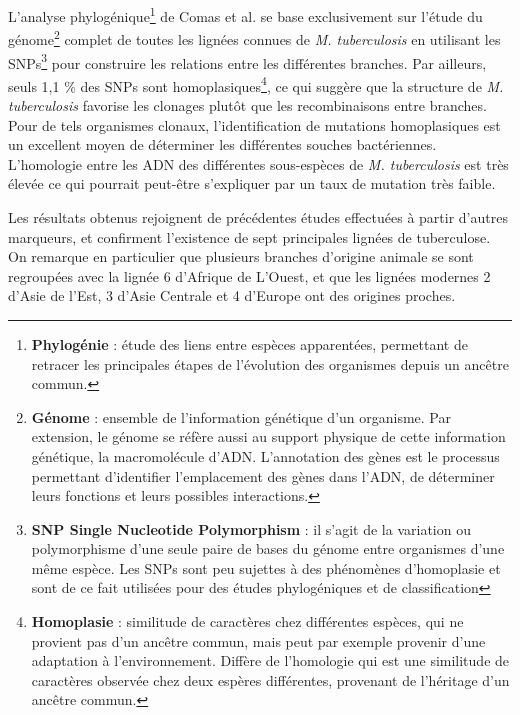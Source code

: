 \documentclass[twoside,a4paper,11pt,frenchb,openany]{report}
\begin{document}

L'analyse phylogénique\footnote{\textbf{Phylogénie} : étude des liens entre espèces apparentées, permettant de retracer les principales étapes de l'évolution des organismes depuis un ancêtre commun.} de Comas et al.\cite{comas} se base exclusivement sur l'étude du génome\footnote{\textbf{Génome} : ensemble de l'information génétique d'un organisme. Par extension, le génome se réfère aussi au support physique de cette information génétique, la macromolécule d'ADN. L'annotation des gènes est le processus permettant d'identifier l'emplacement des gènes dans l'ADN, de déterminer leurs fonctions et leurs possibles interactions.} complet de toutes les lignées connues de \textit{M. tuberculosis} en utilisant les SNPs\footnote{\textbf{SNP Single Nucleotide Polymorphism} : il s'agit de la variation ou polymorphisme d'une seule paire de bases du génome entre organismes d'une même espèce. Les SNPs sont peu sujettes à des phénomènes d'homoplasie et sont de ce fait utilisées pour des études phylogéniques et de classification} pour construire les relations entre les différentes branches. Par ailleurs, seuls 1,1 \% des SNPs sont homoplasiques\footnote{\textbf{Homoplasie} : similitude de caractères chez différentes espèces, qui ne provient pas d'un ancêtre commun, mais peut par exemple provenir d'une adaptation à l'environnement. Diffère de l'homologie qui est une similitude de caractères observée chez deux espères différentes, provenant de l'héritage d'un ancêtre commun.}, ce qui suggère que la structure de \textit{M. tuberculosis} favorise les clonages plutôt que les recombinaisons entre branches. Pour de tels organismes clonaux, l'identification de mutations homoplasiques est un excellent moyen de déterminer les différentes souches bactériennes. L'homologie entre les ADN des différentes sous-espèces de \textit{M. tuberculosis} est très élevée ce qui pourrait peut-être s'expliquer par un taux de mutation très faible.

Les résultats obtenus rejoignent de précédentes études effectuées à partir d'autres marqueurs, et confirment l'existence de sept principales lignées de tuberculose. On remarque en particulier que plusieurs branches d'origine animale se sont regroupées avec la lignée 6 d'Afrique de L'Ouest, et que les lignées modernes 2 d'Asie de l'Est, 3 d'Asie Centrale et 4 d'Europe ont des origines proches. 

\end{document}
